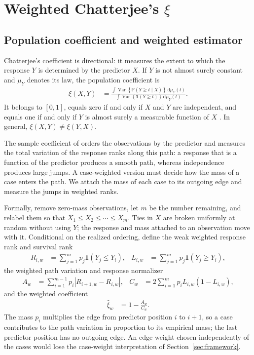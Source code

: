 \section{Weighted Chatterjee's \texorpdfstring{$\xi$}{xi}}
\label{sec:weighted-chatterjee}

\subsection{Population coefficient and weighted estimator}

Chatterjee's coefficient is directional: it measures the extent to which the
response $Y$ is determined by the predictor $X$. If $Y$ is not almost surely
constant and $\mu_Y$ denotes its law, the population coefficient is
\begin{align*}
  \xi(X,Y)
  &=
  \frac{
    \displaystyle
    \int
    \operatorname{Var}\!\left\{
      \mathbb{P}(Y\geq t\mid X)
    \right\}\,\mathrm{d}\mu_Y(t)
  }{
    \displaystyle
    \int
    \operatorname{Var}\!\left\{
      \mathbf{1}(Y\geq t)
    \right\}\,\mathrm{d}\mu_Y(t)
  }.
\end{align*}
It belongs to $[0,1]$, equals zero if and only if $X$ and $Y$ are
independent, and equals one if and only if $Y$ is almost surely a measurable
function of $X$ \citep{chatterjee2021}. In general,
$\xi(X,Y)\neq\xi(Y,X)$.

The sample coefficient of \citet{chatterjee2021} orders the observations by
the predictor and measures the total variation of the response ranks along
this path: a response that is a function of the predictor produces a smooth
path, whereas independence produces large jumps. A case-weighted version must
decide how the mass of a case enters the path. We attach the mass of each case
to its outgoing edge and measure the jumps in weighted ranks.

Formally, remove zero-mass observations, let $m$ be the number remaining, and
relabel them so that $X_1\leq X_2\leq\cdots\leq X_m$. Ties in $X$ are broken
uniformly at random without using $Y$; the response and mass attached to an
observation move with it. Conditional on the realized ordering, define the
weak weighted response rank and survival rank
\begin{align*}
    R_{i,w}
    &= \sum_{j=1}^m p_j\mathbf{1}(Y_j\leq Y_i),
    &
    L_{i,w}
    &= \sum_{j=1}^m p_j\mathbf{1}(Y_j\geq Y_i),
\end{align*}
the weighted path variation and response normalizer
\begin{align*}
    A_w
    &= \sum_{i=1}^{m-1}p_i\left|R_{i+1,w}-R_{i,w}\right|,
    &
    C_w
    &= 2\sum_{i=1}^m p_iL_{i,w}(1-L_{i,w}),
\end{align*}
and the weighted coefficient
\begin{align}
    \widehat\xi_w
    &= 1-\frac{A_w}{C_w}.
    \label{eq:weighted-chatterjee}
\end{align}
The mass $p_i$ multiplies the edge from predictor position $i$ to $i+1$, so a
case contributes to the path variation in proportion to its empirical mass;
the last predictor position has no outgoing edge. An edge weight chosen
independently of the cases would lose the case-weight interpretation of
Section~\ref{sec:framework}.

